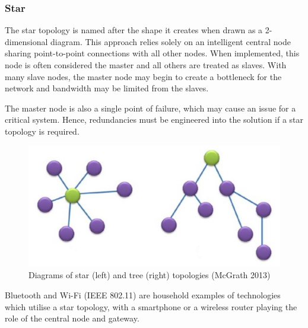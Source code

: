 
\subsubsection{Star}

The star topology is named after the shape it creates when drawn as a 2-dimensional diagram. This approach relies solely on an intelligent central node sharing point-to-point connections with all other nodes. When implemented, this node is often considered the master and all others are treated as slaves. With many slave nodes, the master node may begin to create a bottleneck for the network and bandwidth may be limited from the slaves.

The master node is also a single point of failure, which may cause an issue for a critical system. Hence, redundancies must be engineered into the solution if a star topology is required.

\begin{figure}[h]
\centering
\includegraphics{Figures/star-tree-topology.JPG}
\decoRule
\caption[Star and tree network topologies]{Diagrams of star (left) and tree (right) topologies (McGrath 2013)}
\label{fig:StarTreeTopology}
\end{figure}

Bluetooth and Wi-Fi (IEEE 802.11) are household examples of technologies which utilise a star topology, with a smartphone or a wireless router playing the role of the central node and gateway.



